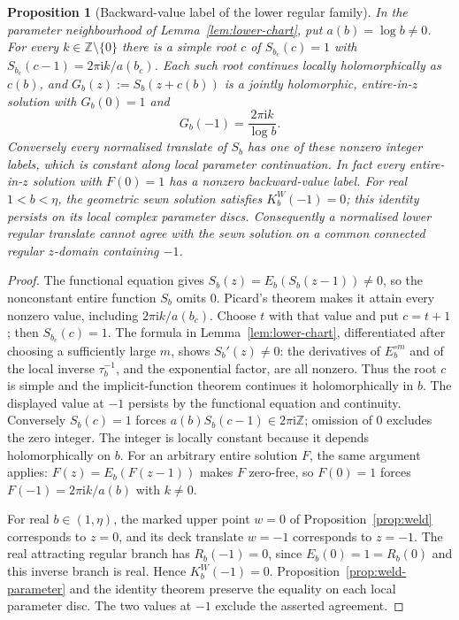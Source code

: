 \documentclass[11pt,a4paper]{article}
\newtheorem{proposition}[theorem]{Proposition}
\theoremstyle{definition}
\newcommand{\Rr}{R}
\newcommand{\Kk}{K}
\newcommand{\ii}{\mathrm{i}}
\begin{document}
\begin{proposition}[Backward-value label of the lower regular family]
\label{prop:lower-backward-label}
In the parameter neighbourhood of Lemma~\ref{lem:lower-chart}, put
$a(b)=\log b\ne0$.  For every $k\in\mathbb Z\setminus\{0\}$ there is a
simple root $c$ of $S_{b_c}(c)=1$ with
$S_{b_c}(c-1)=2\pi\ii k/a(b_c)$.  Each such root continues locally
holomorphically as $c(b)$, and
$G_b(z):=S_b(z+c(b))$ is a jointly holomorphic, entire-in-$z$
solution with $G_b(0)=1$ and
\[
 G_b(-1)=\frac{2\pi\ii k}{\log b}.
\]
Conversely every normalised translate of $S_b$ has one of these nonzero
integer labels, which is constant along local parameter continuation.
In fact every entire-in-$z$ solution with $F(0)=1$ has a nonzero
backward-value label.
For real $1<b<\eta$, the geometric sewn solution satisfies
$\Kk_b^W(-1)=0$; this identity persists on its local complex parameter
discs.  Consequently a normalised lower regular translate cannot
agree with the sewn solution on a common connected regular $z$-domain
containing $-1$.
\end{proposition}

\begin{proof}
The functional equation gives $S_b(z)=E_b(S_b(z-1))\ne0$, so the
nonconstant entire function $S_b$ omits $0$.  Picard's theorem makes
it attain every nonzero value, including $2\pi\ii k/a(b_c)$.
Choose $t$ with that value and put $c=t+1$; then $S_{b_c}(c)=1$.
The formula in Lemma~\ref{lem:lower-chart}, differentiated after
choosing a sufficiently large $m$, shows $S_b'(z)\ne0$: the derivatives
of $E_b^{\circ m}$ and of the local inverse $\tau_b^{-1}$, and the
exponential factor, are all nonzero.  Thus the root $c$ is simple and
the implicit-function theorem continues it holomorphically in $b$.
The displayed value at $-1$ persists by the functional equation and
continuity.  Conversely $S_b(c)=1$ forces
$a(b)S_b(c-1)\in2\pi\ii\mathbb Z$; omission of $0$ excludes the zero
integer.  The integer is locally constant because it depends
holomorphically on $b$.
For an arbitrary entire solution $F$, the same argument applies:
$F(z)=E_b(F(z-1))$ makes $F$ zero-free, so $F(0)=1$ forces
$F(-1)=2\pi\ii k/a(b)$ with $k\ne0$.

For real $b\in(1,\eta)$, the marked upper point $w=0$ of
Proposition~\ref{prop:weld} corresponds to $z=0$, and its deck translate
$w=-1$ corresponds to $z=-1$.  The real attracting regular branch has
$\Rr_b(-1)=0$, since $E_b(0)=1=\Rr_b(0)$ and this inverse branch is real.
Hence $\Kk_b^W(-1)=0$.  Proposition~\ref{prop:weld-parameter} and the
identity theorem preserve the equality on each local parameter disc.
The two values at $-1$ exclude the asserted agreement.
\end{proof}
\end{document}
